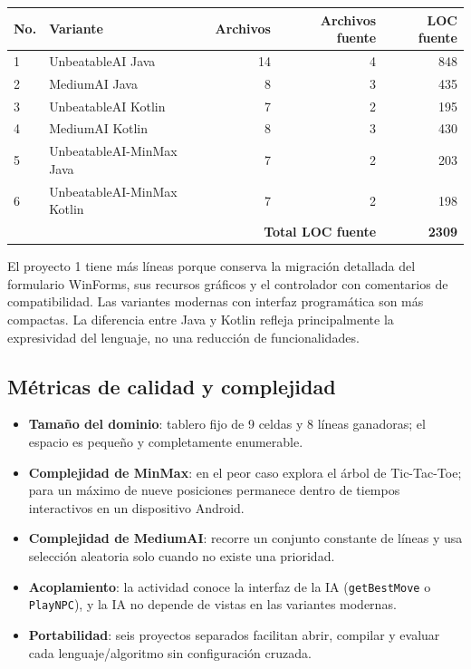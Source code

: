 \documentclass[stu,a4paper,12pt,floatsintext]{apa7}
\begin{document}
\begin{longtable}{p{}p{}r r r}
\toprule
\textbf{No.} & \textbf{Variante} & \textbf{Archivos} &
\textbf{Archivos fuente} & \textbf{LOC fuente}\\
\midrule
1 & UnbeatableAI Java & 14 & 4 & 848\\
2 & MediumAI Java & 8 & 3 & 435\\
3 & UnbeatableAI Kotlin & 7 & 2 & 195\\
4 & MediumAI Kotlin & 8 & 3 & 430\\
5 & UnbeatableAI-MinMax Java & 7 & 2 & 203\\
6 & UnbeatableAI-MinMax Kotlin & 7 & 2 & 198\\
\midrule
\multicolumn{4}{r}{\textbf{Total LOC fuente}} & \textbf{2309}\\
\bottomrule
\end{longtable}

El proyecto 1 tiene más líneas porque conserva la migración detallada del
formulario WinForms, sus recursos gráficos y el controlador con comentarios de
compatibilidad. Las variantes modernas con interfaz programática son más
compactas. La diferencia entre Java y Kotlin refleja principalmente la
expresividad del lenguaje, no una reducción de funcionalidades.

\subsection{Métricas de calidad y complejidad}
\begin{itemize}
  \item \textbf{Tamaño del dominio}: tablero fijo de 9 celdas y 8 líneas
        ganadoras; el espacio es pequeño y completamente enumerable.
  \item \textbf{Complejidad de MinMax}: en el peor caso explora el árbol de
        Tic-Tac-Toe; para un máximo de nueve posiciones permanece dentro de
        tiempos interactivos en un dispositivo Android.
  \item \textbf{Complejidad de MediumAI}: recorre un conjunto constante de
        líneas y usa selección aleatoria solo cuando no existe una prioridad.
  \item \textbf{Acoplamiento}: la actividad conoce la interfaz de la IA
        (\texttt{getBestMove} o \texttt{PlayNPC}), y la IA no depende de vistas
        en las variantes modernas.
  \item \textbf{Portabilidad}: seis proyectos separados facilitan abrir,
        compilar y evaluar cada lenguaje/algoritmo sin configuración cruzada.
\end{itemize}
\end{document}
